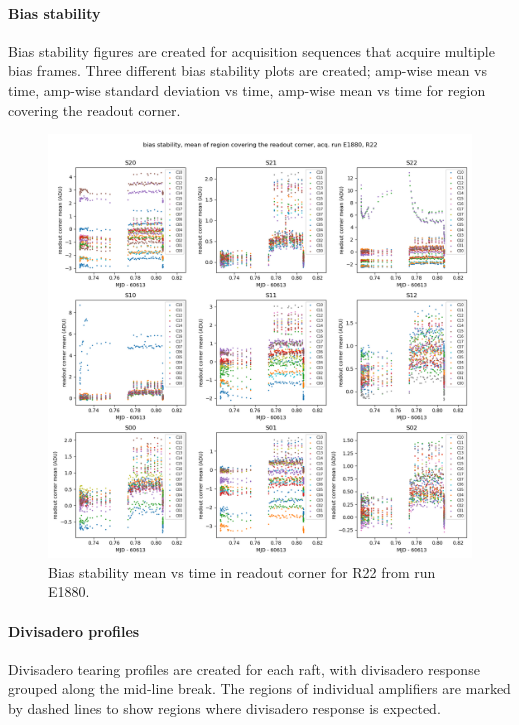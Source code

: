 \paragraph{Bias stability}

Bias stability figures are created for acquisition sequences that acquire multiple bias frames. Three different bias stability plots are created; amp-wise mean vs time, amp-wise standard deviation vs time, amp-wise mean vs time for region covering the readout corner.

\begin{figure}[ht]
    \centering
    \includegraphics[width=0.8\linewidth]{figures/ReferenceFigures/bias_rc_mean_vs_time_plot_LSSTCam_R22_S00_u_lsstccs_eo_bias_stability_E1880_w_2024_35_20241101T020021Z.png}
    \caption{Bias stability mean vs time in readout corner for R22 from run E1880.}
    \label{fig:ref:biasStability}
\end{figure}
\clearpage
\paragraph{Divisadero profiles}

Divisadero tearing profiles are created for each raft, with divisadero response grouped along the mid-line break. The regions of individual amplifiers are marked by dashed lines to show regions where divisadero response is expected.

